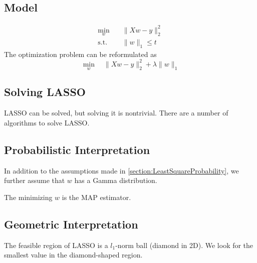 \subsection{Model}
\begin{align*}
    \min_w \quad &\| Xw - y \|_2^2 \\
    \text{s.t.} \quad &\|w\|_1 \le t
\end{align*}
The optimization problem can be reformulated as
\[ \min_w \quad \| Xw - y \|_2^2 + \lambda \|w\|_1 \]
\subsection{Solving LASSO}
LASSO can be solved, but solving it is nontrivial. There are a number of algorithms to solve LASSO.
\subsection{Probabilistic Interpretation}
In addition to the assumptions made in \ref{section:LeastSquareProbability}, we further assume that $w$ has a Gamma distribution.

The minimizing $w$ is the MAP estimator.
\subsection{Geometric Interpretation}
The feasible region of LASSO is a $l_1$-norm ball (diamond in 2D). We look for the smallest value in the diamond-shaped region.